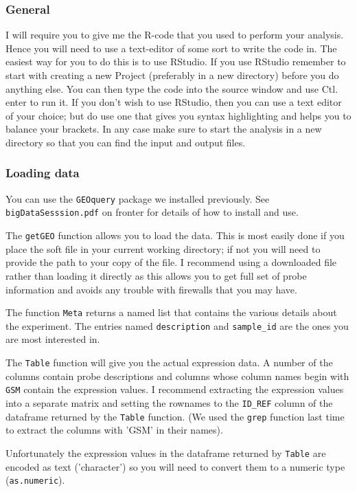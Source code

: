 \documentclass[11pt]{article}
\begin{document}
\subsubsection{General}
I will require you to give me the R-code that you used to perform
your analysis. Hence you will need to use a text-editor of some
sort to write the code in. The easiest way for you to do this is
to use RStudio. If you use RStudio remember to start with creating
a new Project (preferably in a new directory) before you do anything else.
You can then type the code into the source window and use Ctl. enter
to run it. If you don't wish to use RStudio, then you can use a
text editor of your choice; but do use one that gives you syntax
highlighting and helps you to balance your brackets. In any case make
sure to start the analysis in a new directory so that you can find the
input and output files.

\subsubsection{Loading data}
You can use the \texttt{GEOquery} package we installed previously. See
\texttt{bigDataSesssion.pdf} on fronter for details of how to install
and use. 

The \texttt{getGEO} function allows you to load the data. This is most
easily done if you place the soft file in your current working directory;
if not you will need to provide the path to your copy of the file. I recommend
using a downloaded file rather than loading it directly as this allows you
to get full set of probe information and avoids any trouble with firewalls
that you may have.

The function \texttt{Meta} returns a named list
that contains the various details about the experiment. The entries
named \texttt{description} and \texttt{sample\_id} are the ones you
are most interested in.

The \texttt{Table} function will give you the actual expression data. A number
of the columns contain probe descriptions and columns whose
column names begin with \texttt{GSM} contain the expression values. I recommend
extracting the expression values into a separate matrix and setting the
rownames to the \texttt{ID\_REF} column of the dataframe returned by
the \texttt{Table} function. (We used the \texttt{grep} function last time
to extract the columns with 'GSM' in their names).

Unfortunately the expression values in the dataframe returned by \texttt{Table}
are encoded as text ('character') so you will need to convert them
to a numeric type (\texttt{as.numeric}).
\end{document}
